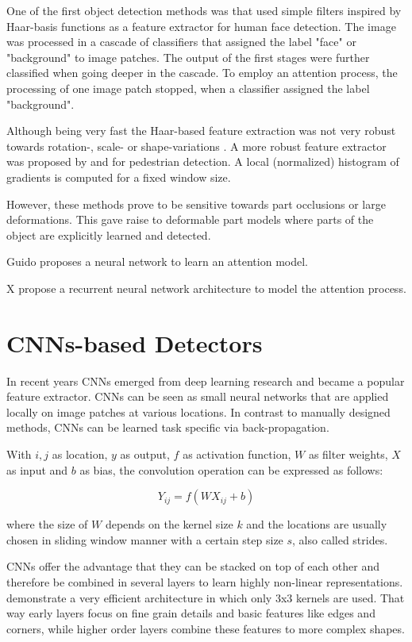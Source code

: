 	One of the first object detection methods was \cite{Viola2004} that used simple filters inspired by Haar-basis functions as a feature extractor for human face detection. The image was processed in a cascade of classifiers that assigned the label "face" or "background" to image patches. The output of the first stages were further classified when going deeper in the cascade. To employ an attention process, the processing of one image patch stopped, when a classifier assigned the label "background".
	
	Although being very fast the Haar-based feature extraction was not very robust towards rotation-, scale- or shape-variations . A more robust feature extractor was proposed by \cite{Dalal} and \cite{Lowe2004} for pedestrian detection. A local (normalized) histogram of gradients is computed for a fixed window size. 

	However, these methods prove to be sensitive towards part occlusions or large deformations. This gave raise to deformable part models where parts of the object are explicitly learned and detected.  

	
	Guido proposes a neural network to learn an attention model.
	
	X propose a recurrent neural network architecture to model the attention process.
	
	\section{\acp{CNN}-based Detectors}
	
	In recent years \acp{CNN} emerged from deep learning research and became a popular feature extractor. \acp{CNN} can be seen as small neural networks that are applied locally on image patches at various locations. In contrast to manually designed methods, \acp{CNN} can be learned task specific via back-propagation.
	
	With $i,j$ as location, $y$ as output, $f$ as activation function, $W$ as filter weights, $X$ as input and $b$ as bias, the convolution operation can be expressed as follows:
	
	$$Y_{ij} = f(WX_{ij} + b)$$
	
	where the size of $W$ depends on the kernel size $k$ and the locations are usually chosen in sliding window manner with a certain step size $s$, also called strides.
	
	\acp{CNN} offer the advantage that they can be stacked on top of each other and therefore be combined in several layers to learn highly non-linear representations.
	 demonstrate a very efficient architecture in which only 3x3 kernels are used. That way early layers focus on fine grain details and basic features like edges and corners, while higher order layers combine these features to more complex shapes. 
	

